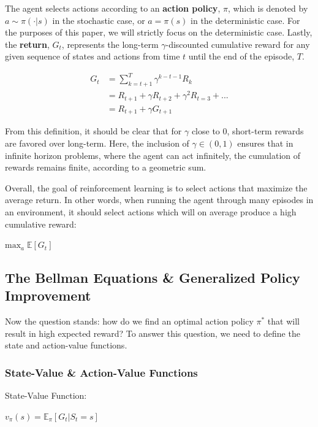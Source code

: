 \documentclass{article}
\begin{document}
The agent selects actions according to an \textbf{action policy}, $\pi$, which is denoted by $a\sim\pi(\cdot|s)$ in the stochastic case, or $a=\pi(s)$ in the deterministic case. For the purposes of this paper, we will strictly focus on the deterministic case. Lastly, the \textbf{return}, $G_t$, represents the long-term $\gamma$-discounted cumulative reward for any given sequence of states and actions from time $t$ until the end of the episode, $T$.
\vspace{-5mm}\begin{center}
    \begin{align*}
        G_t &=\sum_{k=t+1}^{T}\gamma^{k-t-1}R_k \\
        &=R_{t+1}+\gamma R_{t+2}+\gamma^2R_{t=3}+...\\
        &=R_{t+1}+\gamma G_{t+1}
    \end{align*}
\end{center}
From this definition, it should be clear that for $\gamma$ close to 0, short-term rewards are favored over long-term. Here, the inclusion of $\gamma\in(0,1)$ ensures that in infinite horizon problems, where the agent can act infinitely, the cumulation of rewards remains finite, according to a geometric sum.

Overall, the goal of reinforcement learning is to select actions that maximize the average return. In other words, when running the agent through many episodes in an environment, it should select actions which will on average produce a high cumulative reward:
\begin{center}
    $\text{max}_a\;\mathbb{E}[G_t]$
\end{center}

\subsection{The Bellman Equations \& Generalized Policy Improvement}

Now the question stands: how do we find an optimal action policy $\pi^*$ that will result in high expected reward? To answer this question, we need to define the state and action-value functions.

\subsubsection{State-Value \& Action-Value Functions}

State-Value Function:
\begin{center}
    $v_{\pi}(s)=\mathbb{E}_{\pi}[G_t|S_t=s]$
\end{center}
\end{document}
